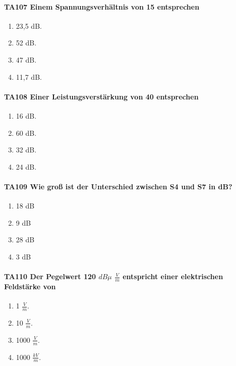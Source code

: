 \documentclass[8pt]{article}
\begin{document}
\begin{enumerate}
\paragraph*{TA107 Einem Spannungsverhältnis von 15 entsprechen}
\begin{enumerate}[nolistsep,label=\Alph*]
\item 23,5 dB.
\item 52 dB.
\item 47 dB.
\item 11,7 dB.
\end{enumerate}



\paragraph*{TA108 Einer Leistungsverstärkung von 40 entsprechen}
\begin{enumerate}[nolistsep,label=\Alph*]
\item 16 dB.
\item 60 dB.
\item 32 dB.
\item 24 dB.
\end{enumerate}



\paragraph*{TA109 Wie groß ist der Unterschied zwischen S4 und S7 in dB?}
\begin{enumerate}[nolistsep,label=\Alph*]
\item 18 dB
\item 9 dB
\item 28 dB
\item 3 dB
\end{enumerate}



\paragraph*{TA110 Der Pegelwert 120 $dB\mu$ $\frac{V}{m}$ entspricht einer elektrischen Feldstärke von}
\begin{enumerate}[nolistsep,label=\Alph*]
\item 1 $\frac{V}{m}$.
\item 10 $\frac{V}{m}$.
\item 1000 $\frac{V}{m}$.
\item 1000 $\frac{kV}{m}$.
\end{enumerate}




\end{enumerate}
\end{document}
